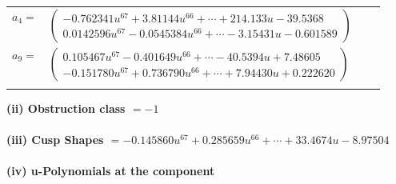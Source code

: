 \documentclass[1p]{elsarticle_modified}
\theoremstyle{definition}
\begin{document}
\begin{tabular}{m{7pt} m{180pt} m{7pt} m{180pt} }
\flushright $a_{4}=$&$\begin{pmatrix}-0.762341 u^{67}+3.81144 u^{66}+\cdots+214.133 u-39.5368\\0.0142596 u^{67}-0.0545384 u^{66}+\cdots-3.15431 u-0.601589\end{pmatrix}$ \\
\flushright $a_{9}=$&$\begin{pmatrix}0.105467 u^{67}-0.401649 u^{66}+\cdots-40.5394 u+7.48605\\-0.151780 u^{67}+0.736790 u^{66}+\cdots+7.94430 u+0.222620\end{pmatrix}$\\&\end{tabular}
\flushleft \textbf{(ii) Obstruction class $= -1$}\\~\\
\flushleft \textbf{(iii) Cusp Shapes $= -0.145860 u^{67}+0.285659 u^{66}+\cdots+33.4674 u-8.97504$}\\~\\
\newpage\renewcommand{\arraystretch}{1}
\flushleft \textbf{(iv) u-Polynomials at the component}\newline \\
\end{document}
